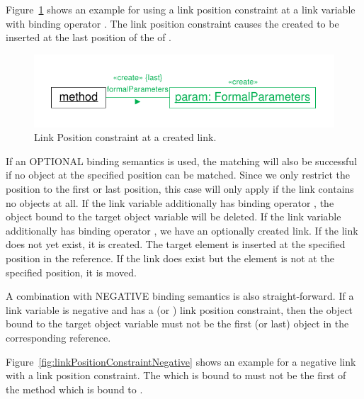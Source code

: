 {Figure~\ref{fig:linkPositionConstraintCreate} shows an example for using a link position constraint at a link variable with binding operator \create. The link position constraint causes the created  to be inserted at the last position of the  of .

\begin{figure}[htbp]
\center
\includegraphics[width=0.75\columnwidth]{figures/LinkPositionConstraintCreate}
\caption{Link Position constraint at a created link.}
\label{fig:linkPositionConstraintCreate}
\end{figure}

If an OPTIONAL binding semantics is used, the matching will also be successful if no object at the specified position can be matched. Since we only restrict the position to the first or last position, this case will only apply if the link contains no objects at all. If the link variable additionally has binding operator \destroy, the object bound to the target object variable will be deleted. If the link variable additionally has binding operator \create, we have an optionally created link. If the link does not yet exist, it is created. The target element is inserted at the specified position in the reference. If the link does exist but the element is not at the specified position, it is moved.


A combination with NEGATIVE binding semantics is also straight-forward. If a link variable is negative and has a  (or ) link position constraint, then the object bound to the target object variable must not be the first (or last) object in the corresponding reference.

Figure~\ref{fig:linkPositionConstraintNegative} shows an example for a negative link with a link position constraint. The  which is bound to  must not be the first  of the method which is bound to .


}

